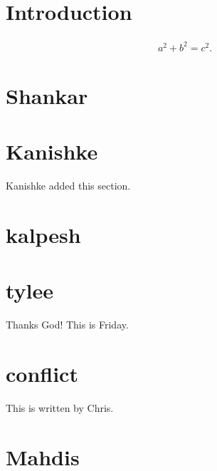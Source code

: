 \documentclass{article}
\begin{document}
\section{Introduction}

\begin{align}
    a^2 + b^2 = c^2 .
\end{align}


\section{Shankar}

 
\section{Kanishke}
Kanishke added this section.

\section{kalpesh}



\section{tylee}

Thanks God! This is Friday.

\section{conflict}

This is written by Chris.

\section{Mahdis}
\end{document}

